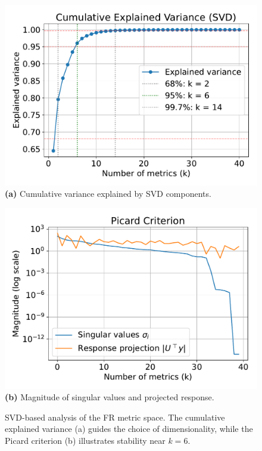 \begin{figure}
    \centering
    \begin{minipage}{0.48\textwidth}
        \centering
        \includegraphics[width=\linewidth]{images/variance.pdf}
        \textbf{(a)} Cumulative variance explained by SVD components.
    \end{minipage}
    \hfill
    \begin{minipage}{0.48\textwidth}
        \centering
        \includegraphics[width=\linewidth]{images/picard.pdf}
        \textbf{(b)} Magnitude of singular values and projected response.
    \end{minipage}
    \caption{SVD-based analysis of the FR metric space. The cumulative explained variance (a) guides the choice of dimensionality, while the Picard criterion (b) illustrates stability near $k=6$.}\label{fig:svd_analysis}
\end{figure}

